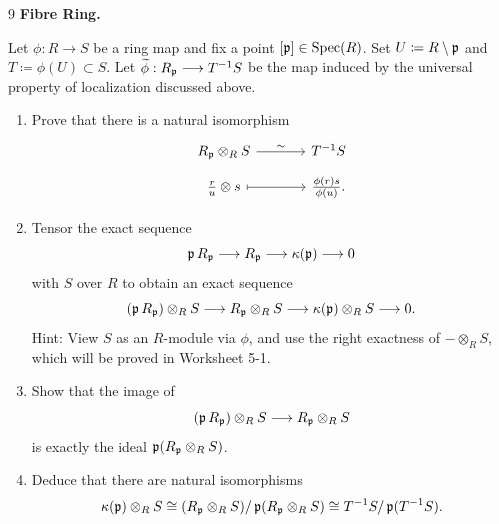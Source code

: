 \documentclass[Notebook.tex]{subfiles}
\begin{document}
\newpage 

\begin{problem}{9}
    \textbf{Fibre Ring.} 
    
    Let $\phi:R\to S$ be a ring map and fix a point $[\operatorname{\mathfrak{p}}]\in \operatorname{Spec}(R)$. Set $U \coloneqq R \setminus \operatorname{\mathfrak{p}}$ and $T\coloneqq \phi(U) \subset S$. Let $\widetilde{\phi}:R_{\operatorname{\mathfrak{p}}}\longrightarrow T^{-1}S$ be the map induced by the universal property of localization discussed above. 
    \begin{enumerate}
        \item\label{ex-pt:fibre-ring-iso} Prove that there is a natural isomorphism
        \[
        \begin{tikzcd}[row sep=.5em, column sep=3.5em]
        R_{\fp}\otimes_R S \arrow[r, "\sim"] & T^{-1}S \\
        \frac{r}{u}\otimes s \arrow[r, mapsto] & \frac{\phi(r)s}{\phi(u)}.
        \end{tikzcd}
        \]
        
        \item Tensor the exact sequence
        \[
        \operatorname{\mathfrak{p}} R_{\operatorname{\mathfrak{p}}}\longrightarrow R_{\operatorname{\mathfrak{p}}}\longrightarrow \kappa(\operatorname{\mathfrak{p}})\longrightarrow 0
        \]
        with $S$ over $R$ to obtain an exact sequence
        \[
        (\operatorname{\mathfrak{p}} R_{\operatorname{\mathfrak{p}}})\otimes_R S \longrightarrow R_{\operatorname{\mathfrak{p}}}\otimes_R S \longrightarrow \kappa(\operatorname{\mathfrak{p}})\otimes_R S \longrightarrow 0.
        \]
        Hint: View $S$ as an $R$-module via $\phi$, and use the right exactness of $-\otimes_R S$, which will be proved in Worksheet 5-1.
        
        \item Show that the image of
        \[
        (\operatorname{\mathfrak{p}} R_{\operatorname{\mathfrak{p}}})\otimes_R S \longrightarrow R_{\operatorname{\mathfrak{p}}}\otimes_R S
        \]
        is exactly the ideal $\operatorname{\mathfrak{p}}(R_{\operatorname{\mathfrak{p}}}\otimes_R S)$.
        
        \item Deduce that there are natural isomorphisms
        \[
        \kappa(\operatorname{\mathfrak{p}})\otimes_R S
        \cong
        (R_{\operatorname{\mathfrak{p}}}\otimes_R S)/\operatorname{\mathfrak{p}}(R_{\operatorname{\mathfrak{p}}}\otimes_R S)
        \cong
        T^{-1}S/\operatorname{\mathfrak{p}}(T^{-1}S).
        \]
    \end{enumerate}
\end{problem}
\end{document}
